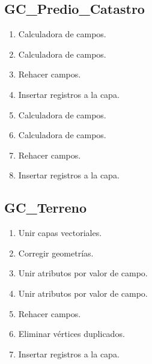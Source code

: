 \documentclass[letterpaper,10pt,spanish]{sphinxmanual}
\begin{document}
\subsection{GC\_Predio\_Catastro}
\label{\detokenize{ETL_SNC/Model:gc-predio-catastro}}\begin{enumerate}
%
\item {} 
Calculadora de campos.

\item {} 
Calculadora de campos.

\item {} 
Rehacer campos.

\item {} 
Insertar registros a la capa.

\item {} 
Calculadora de campos.

\item {} 
Calculadora de campos.

\item {} 
Rehacer campos.

\item {} 
Insertar registros a la capa.


\end{enumerate}


\subsection{GC\_Terreno}
\label{\detokenize{ETL_SNC/Model:gc-terreno}}\begin{enumerate}
%
\item {} 
Unir capas vectoriales.

\item {} 
Corregir geometrías.

\item {} 
Unir atributos por valor de campo.

\item {} 
Unir atributos por valor de campo.

\item {} 
Rehacer campos.

\item {} 
Eliminar vértices duplicados.

\item {} 
Insertar registros a la capa.


\end{enumerate}
\end{document}
